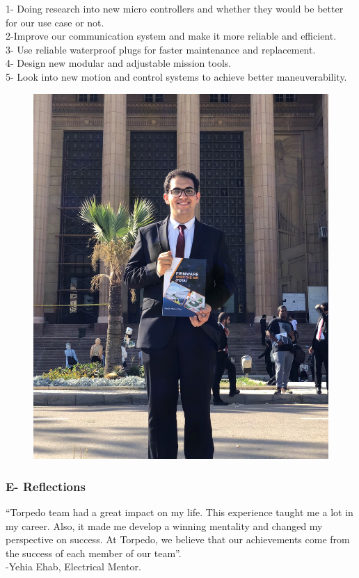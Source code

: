 \documentclass[a4paper,12pt,leqno]{report}
\begin{document}
1- Doing research into new micro controllers and whether they would be better for our use  case or not. \\
2-Improve our communication system and make it more reliable and efficient. \\
3- Use reliable waterproof plugs for faster maintenance and replacement. \\
4- Design new modular and adjustable mission tools. \\
5- Look into new motion and control systems to achieve better maneuverability. 
\begin{figure}
	\centering
	\includegraphics[width = .3\textwidth, height = .16\textheight]{Yehia Ehab}
\end{figure}
\textcolor{blue!40}{
\subsubsection{E- Reflections}}
“Torpedo team had a great impact on my life. This experience taught me a lot in my career. Also, it made me develop a winning mentality and changed my perspective on success. At Torpedo, we believe that our achievements come from the success of each member of our team”.  \\
-Yehia Ehab, Electrical Mentor. \\
\end{document}
